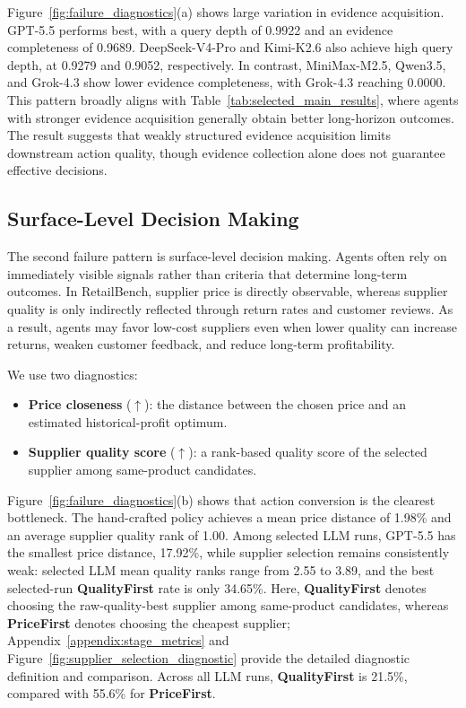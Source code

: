 Figure~\ref{fig:failure_diagnostics}(a) shows large variation in evidence acquisition. GPT-5.5 performs best, with a query depth of 0.9922 and an evidence completeness of 0.9689. DeepSeek-V4-Pro and Kimi-K2.6 also achieve high query depth, at 0.9279 and 0.9052, respectively. In contrast, MiniMax-M2.5, Qwen3.5, and Grok-4.3 show lower evidence completeness, with Grok-4.3 reaching 0.0000. This pattern broadly aligns with Table~\ref{tab:selected_main_results}, where agents with stronger evidence acquisition generally obtain better long-horizon outcomes. The result suggests that weakly structured evidence acquisition limits downstream action quality, though evidence collection alone does not guarantee effective decisions.

\subsection{Surface-Level Decision Making}

The second failure pattern is surface-level decision making. Agents often rely on immediately visible signals rather than criteria that determine long-term outcomes. In RetailBench, supplier price is directly observable, whereas supplier quality is only indirectly reflected through return rates and customer reviews. As a result, agents may favor low-cost suppliers even when lower quality can increase returns, weaken customer feedback, and reduce long-term profitability.

We use two diagnostics:
\begin{itemize}[leftmargin=*]
    \item \textbf{Price closeness} ($\uparrow$): the distance between the chosen price and an estimated historical-profit optimum.
    \item \textbf{Supplier quality score} ($\uparrow$): a rank-based quality score of the selected supplier among same-product candidates.
\end{itemize}

Figure~\ref{fig:failure_diagnostics}(b) shows that action conversion is the clearest bottleneck. The hand-crafted policy achieves a mean price distance of 1.98\% and an average supplier quality rank of 1.00. Among selected LLM runs, GPT-5.5 has the smallest price distance, 17.92\%, while supplier selection remains consistently weak: selected LLM mean quality ranks range from 2.55 to 3.89, and the best selected-run \textbf{QualityFirst} rate is only 34.65\%. Here, \textbf{QualityFirst} denotes choosing the raw-quality-best supplier among same-product candidates, whereas \textbf{PriceFirst} denotes choosing the cheapest supplier; Appendix~\ref{appendix:stage_metrics} and Figure~\ref{fig:supplier_selection_diagnostic} provide the detailed diagnostic definition and comparison. Across all LLM runs, \textbf{QualityFirst} is 21.5\%, compared with 55.6\% for \textbf{PriceFirst}.

